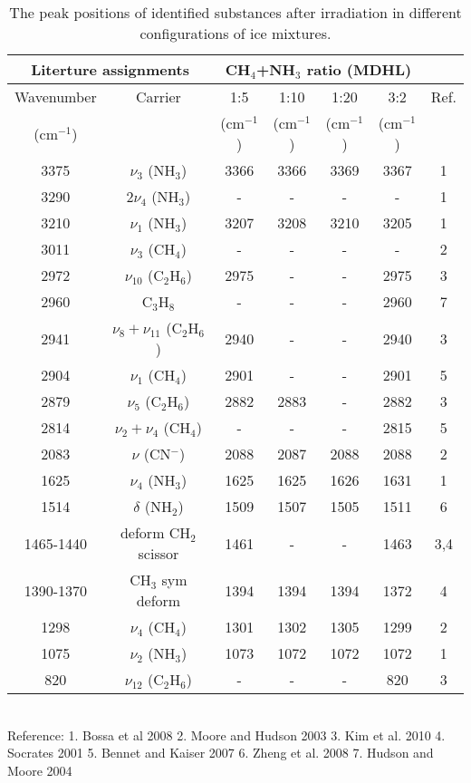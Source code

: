\begin{table}[htbp]
\caption{The peak positions of identified substances after irradiation in different configurations of ice mixtures.}
\label{tab:WavenumberMDHL}
\begin{tabular}{ccccccc}
\hline
\hline
\multicolumn{2}{c}{Literture assignments} & \multicolumn{4}{c}{CH$_4$+NH$_3$ ratio (MDHL)} &  \\
\hline
Wavenumber & Carrier  & 1:5  & 1:10  & 1:20  & 3:2  & Ref. \\
(cm$^{-1}$) &   & (cm$^{-1}$) & (cm$^{-1}$) & (cm$^{-1}$) & (cm$^{-1}$) &\\
\hline
3375 & $\nu_3$ (NH$_3$) & 3366 & 3366 & 3369 & 3367 & 1 \\
3290 & $2\nu_4$ (NH$_3$) & - & - & - & - & 1 \\
3210 & $\nu_1$ (NH$_3$) & 3207 & 3208 & 3210 & 3205 & 1 \\
3011 & $\nu_3$ (CH$_4$) & - & - & - & - & 2 \\
2972 & $\nu_{10}$ (C$_2$H$_6$) & 2975 & - & - & 2975 & 3 \\
2960 & C$_3$H$_8$ & - & - & - & 2960 & 7 \\
2941 & $\nu_8+\nu_11$ (C$_2$H$_6$) & 2940 & - & - & 2940 & 3 \\
2904 & $\nu_1$ (CH$_4$) & 2901 & - & - & 2901 & 5 \\
2879 & $\nu_5$ (C$_2$H$_6$) & 2882 & 2883 & - & 2882 & 3 \\
2814 & $\nu_2+\nu_4$ (CH$_4$) & - & - & - & 2815 & 5 \\
2083 & $\nu$ (CN$^-$) & 2088 & 2087 & 2088 & 2088 & 2 \\
1625 & $\nu_4$ (NH$_3$) & 1625 & 1625 & 1626 & 1631 & 1 \\
1514 & $\delta$ (NH$_2$) & 1509 & 1507 & 1505 & 1511 & 6 \\
1465-1440 & deform CH$_2$ scissor & 1461 & - & - & 1463 & 3,4 \\
1390-1370 & CH$_3$ sym deform & 1394 & 1394 & 1394 & 1372 & 4 \\
1298 & $\nu_4$ (CH$_4$) & 1301 & 1302 & 1305 & 1299 & 2 \\
1075 & $\nu_2$ (NH$_3$) & 1073 & 1072 & 1072 & 1072 & 1 \\
820 & $\nu_12$ (C$_2$H$_6$) & - & - & - & 820 & 3 \\
\hline
\end{tabular}\\
Reference: 1. Bossa et al 2008 2. Moore and Hudson 2003 3. Kim et al. 2010 4. Socrates 2001 5. Bennet and Kaiser 2007 6. Zheng et al. 2008 7. Hudson and Moore 2004
\end{table}

